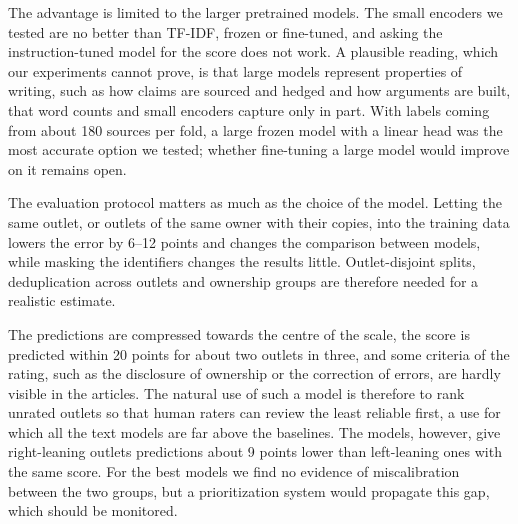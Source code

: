 \documentclass[11pt,a4paper]{article}
\begin{document}
The advantage is limited to the larger pretrained models. The small encoders we tested are no better than TF-IDF,
frozen or fine-tuned, and asking the instruction-tuned model for the score does not work. A plausible reading, which our
experiments cannot prove, is that large models represent properties of writing, such as how claims are sourced and
hedged and how arguments are built, that word counts and small encoders capture only in part. With labels coming from
about 180 sources per fold, a large frozen model with a linear head was the most accurate option we tested; whether
fine-tuning a large model would improve on it remains open.

The evaluation protocol matters as much as the choice of the model. Letting the same outlet, or outlets of the same owner
with their copies, into the training data lowers the error by 6--12 points and changes the comparison between models,
while masking the identifiers changes the results little. Outlet-disjoint splits, deduplication across outlets and
ownership groups are therefore needed for a realistic estimate.

The predictions are compressed towards the centre of the scale, the score is predicted within 20 points for about two
outlets in three, and some criteria of the rating, such as the disclosure of ownership or the correction of errors, are
hardly visible in the articles. The natural use of such a model is therefore to rank unrated outlets so that human
raters can review the least reliable first, a use for which all the text models are far above the baselines. The models,
however, give right-leaning outlets predictions about 9 points lower than left-leaning ones with the same score. For the
best models we find no evidence of miscalibration between the two groups, but a prioritization system would propagate
this gap, which should be monitored.
\end{document}
